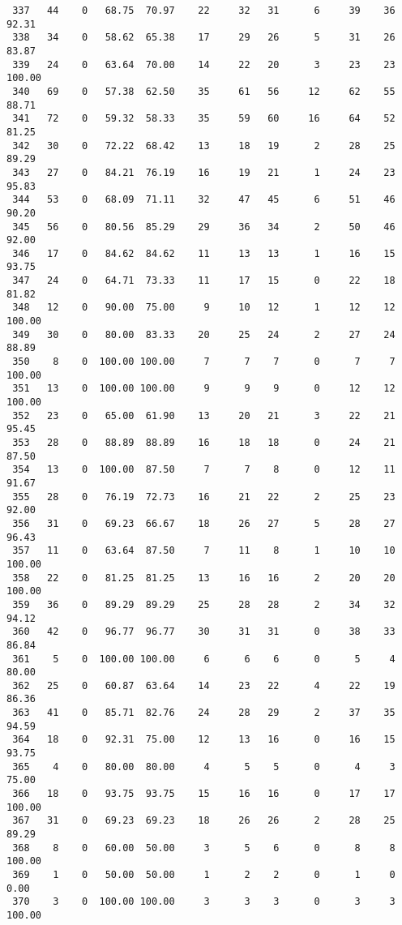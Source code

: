 \begin{verbatim}
 337   44    0   68.75  70.97    22     32   31      6     39    36    92.31
 338   34    0   58.62  65.38    17     29   26      5     31    26    83.87
 339   24    0   63.64  70.00    14     22   20      3     23    23   100.00
 340   69    0   57.38  62.50    35     61   56     12     62    55    88.71
 341   72    0   59.32  58.33    35     59   60     16     64    52    81.25
 342   30    0   72.22  68.42    13     18   19      2     28    25    89.29
 343   27    0   84.21  76.19    16     19   21      1     24    23    95.83
 344   53    0   68.09  71.11    32     47   45      6     51    46    90.20
 345   56    0   80.56  85.29    29     36   34      2     50    46    92.00
 346   17    0   84.62  84.62    11     13   13      1     16    15    93.75
 347   24    0   64.71  73.33    11     17   15      0     22    18    81.82
 348   12    0   90.00  75.00     9     10   12      1     12    12   100.00
 349   30    0   80.00  83.33    20     25   24      2     27    24    88.89
 350    8    0  100.00 100.00     7      7    7      0      7     7   100.00
 351   13    0  100.00 100.00     9      9    9      0     12    12   100.00
 352   23    0   65.00  61.90    13     20   21      3     22    21    95.45
 353   28    0   88.89  88.89    16     18   18      0     24    21    87.50
 354   13    0  100.00  87.50     7      7    8      0     12    11    91.67
 355   28    0   76.19  72.73    16     21   22      2     25    23    92.00
 356   31    0   69.23  66.67    18     26   27      5     28    27    96.43
 357   11    0   63.64  87.50     7     11    8      1     10    10   100.00
 358   22    0   81.25  81.25    13     16   16      2     20    20   100.00
 359   36    0   89.29  89.29    25     28   28      2     34    32    94.12
 360   42    0   96.77  96.77    30     31   31      0     38    33    86.84
 361    5    0  100.00 100.00     6      6    6      0      5     4    80.00
 362   25    0   60.87  63.64    14     23   22      4     22    19    86.36
 363   41    0   85.71  82.76    24     28   29      2     37    35    94.59
 364   18    0   92.31  75.00    12     13   16      0     16    15    93.75
 365    4    0   80.00  80.00     4      5    5      0      4     3    75.00
 366   18    0   93.75  93.75    15     16   16      0     17    17   100.00
 367   31    0   69.23  69.23    18     26   26      2     28    25    89.29
 368    8    0   60.00  50.00     3      5    6      0      8     8   100.00
 369    1    0   50.00  50.00     1      2    2      0      1     0     0.00
 370    3    0  100.00 100.00     3      3    3      0      3     3   100.00

\end{verbatim}
